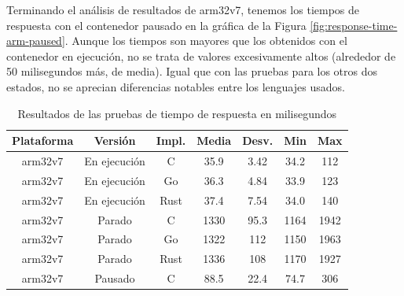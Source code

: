 \newpage

Terminando el análisis de resultados de arm32v7, tenemos los tiempos de
respuesta con el contenedor pausado en la gráfica de la Figura
\ref{fig:response-time-arm-paused}. Aunque los tiempos son mayores que los
obtenidos con el contenedor en ejecución, no se trata de valores excesivamente
altos (alrededor de 50 milisegundos más, de media). Igual que con las pruebas
para los otros dos estados, no se aprecian diferencias notables entre los
lenguajes usados.

\begin{table}[]
    \caption{Resultados de las pruebas de tiempo de respuesta en milisegundos}
    \label{tab:response-results}
    \begin{center}
        \begin{tabular}{ |c|c|c|c|c|c|c| }
            \hline
            \textbf{Plataforma} & \textbf{Versión} & \textbf{Impl.} & \textbf{Media} &
            \textbf{Desv.}      & \textbf{Min}     & \textbf{Max}                      \\
            \hline
            arm32v7             & En ejecución     & C              & 35.9
                                & 3.42             & 34.2           & 112              \\
            \hline
            arm32v7             & En ejecución     & Go             & 36.3
                                & 4.84             & 33.9           & 123              \\
            \hline
            arm32v7             & En ejecución     & Rust           & 37.4
                                & 7.54             & 34.0           & 140              \\
            \hline
            arm32v7             & Parado           & C              & 1330
                                & 95.3             & 1164           & 1942             \\
            \hline
            arm32v7             & Parado           & Go             & 1322
                                & 112              & 1150           & 1963             \\
            \hline
            arm32v7             & Parado           & Rust           & 1336
                                & 108              & 1170           & 1927             \\
            \hline
            arm32v7             & Pausado          & C              & 88.5
                                & 22.4             & 74.7           & 306              \\

\end{tabular}
\end{center}
\end{table}
